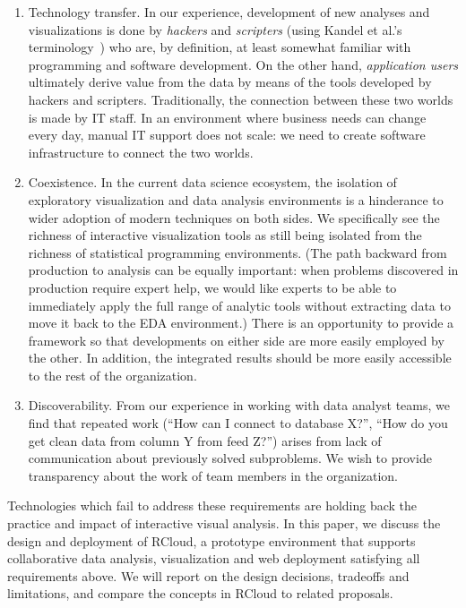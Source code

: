 \begin{enumerate}

\item Technology transfer. In our experience, development
of new analyses and visualizations is done by \emph{hackers}
and \emph{scripters} (using Kandel et al.'s
terminology~\cite{Kandel:2012:EDA}) who are, by definition,
at least somewhat familiar with programming and software development.
On the other hand, \emph{application
users} ultimately derive value from the data by means of the tools
developed by hackers and scripters. Traditionally, the connection
between these two worlds is made by IT staff. In an environment where
business needs can change every day, manual IT support does not scale:
we need to create software infrastructure to connect the two worlds.

\item Coexistence. In the current data science ecosystem, the
isolation of exploratory visualization and data analysis
environments is a hinderance to wider adoption of modern techniques
on both sides. We specifically see the richness of interactive
visualization tools as still being isolated from the richness
of statistical programming environments.
(The path backward from production to analysis can be 
equally important: when problems discovered in
production require expert help, we would like experts to be
able to immediately apply the full range of analytic tools without
extracting data to move it back to the EDA environment.)
There is an opportunity to provide a framework so that developments
on either side are more easily employed by the other.
In addition, the integrated results should be more easily accessible
to the rest of the organization.

\item Discoverability. From our experience in working with data
analyst teams, we find that repeated work (``How can I connect to
database X?'', ``How do you get clean data from column Y from feed
Z?'') arises from lack of communication about previously solved subproblems.
We wish to provide transparency about the work of team members in the organization.

\end{enumerate}

Technologies which fail to address these requirements
are holding back the practice and impact of interactive visual
analysis. In this paper, we discuss the design and deployment of
RCloud, a prototype environment that supports collaborative data
analysis, visualization and web deployment satisfying all requirements
above. We will report on the design decisions, tradeoffs and
limitations, and compare the concepts in RCloud to related proposals.


